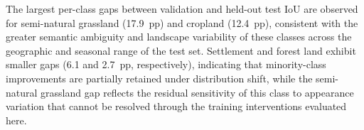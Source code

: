 The largest per-class gaps between validation and held-out test IoU are observed for semi-natural grassland (17.9~pp) and cropland (12.4~pp), consistent with the greater semantic ambiguity and landscape variability of these classes across the geographic and seasonal range of the test set. Settlement and forest land exhibit smaller gaps (6.1 and 2.7~pp, respectively), indicating that minority-class improvements are partially retained under distribution shift, while the semi-natural grassland gap reflects the residual sensitivity of this class to appearance variation that cannot be resolved through the training interventions evaluated here.
